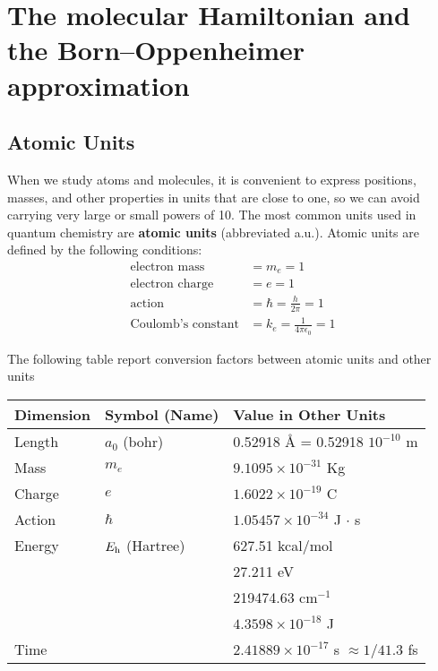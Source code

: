 \documentclass[../Main/chem532-notes.tex]{subfiles}
\begin{document}
\chapter[The molecular Hamiltonian]{The molecular Hamiltonian and the Born--Oppenheimer approximation}

\section{Atomic Units}
When we study atoms and molecules, it is convenient to express positions, masses, and other properties in units that are close to one, so we can avoid carrying very large or small powers of 10.
The most common units used in quantum chemistry are \textbf{atomic units} (abbreviated a.u.). Atomic units are defined by the following conditions:
\begin{align}
\text{electron mass} & = m_e = 1\\
\text{electron charge} & = e = 1\\
\text{action} & = \hbar = \frac{h}{2\pi} = 1\\
\text{Coulomb's constant} & = k_e = \frac{1}{4\pi \epsilon_0} = 1
\end{align}

The following table report conversion factors between atomic units and other units 
\begin{table}[htbp]
\centering
\begin{tabular}{lll}
\toprule
Dimension & Symbol (Name) & Value in Other Units\\
\midrule
Length & $a_0$ (bohr) & 0.52918 \AA{} = 0.52918 $10^{-10}$ m\\ 
Mass & $m_e$ & $9.1095 \times 10^{-31}$ Kg \\
Charge & $e$ & $1.6022 \times 10^{-19}$ C \\
Action & $\hbar$ & $1.05457 \times 10^{-34}$ J $\cdot$ s \\
Energy & $E_{\rm h}$ (Hartree) & 627.51 kcal/mol \\
& & 27.211 eV \\
& & 219474.63 cm$^{-1}$ \\
& & $4.3598 \times 10^{-18}$ J\\
Time & & $2.41889 \times 10^{-17}$ s $\approx 1/41.3$ fs\\
\bottomrule
\end{tabular}
\label{tab:atomicunits}
\end{table}
\end{document}
